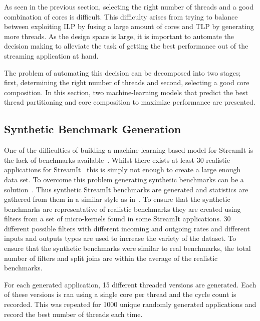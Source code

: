 As seen in the previous section, selecting the right number of threads and a good combination of cores is difficult.
This difficulty arises from trying to balance between exploiting ILP by fusing a large amount of cores and TLP by generating more threads.
As the design space is large, it is important to automate the decision making to alleviate the task of getting the best performance out of the streaming application at hand.

The problem of automating this decision can be decomposed into two stages; first, determining the right number of threads and second, selecting a good core composition.
In this section, two machine-learning models that predict the best thread partitioning and core composition to maximize performance are presented.

\subsection{Synthetic Benchmark Generation}

One of the difficulties of building a machine learning based model for StreamIt is the lack of benchmarks available~\cite{wang2013partitionstreamit}.
Whilst there exists at least 30 realistic applications for StreamIt~\cite{theis2010empericalcharstreamit} this is simply not enough to create a large enough data set.
To overcome this problem generating synthetic benchmarks can be a solution~\cite{cumminsopencl2017}.
Thus synthetic StreamIt benchmarks are generated and statistics are gathered from them in a similar style as in~\cite{wang2013partitionstreamit}.
To ensure that the synthetic benchmarks are representative of realistic benchmarks they are created using filters from a set of micro-kernels found in some StreamIt applications.
30 different possible filters with different incoming and outgoing rates and different inputs and outputs types are used to increase the variety of the dataset.
To ensure that the synthetic benchmarks were similar to real benchmarks, the total number of filters and split joins are within the average of the realistic benchmarks.

For each generated application, 15 different threaded versions are generated.
Each of these versions is ran using a single core per thread and the cycle count is recorded.
This was repeated for 1000 unique randomly generated applications and record the best number of threads each time.


